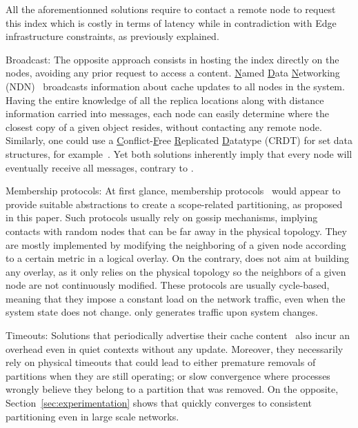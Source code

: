 \begin{asparadesc}
All the aforementionned solutions require to contact a remote node to request this index which is costly in terms of
latency while in contradiction with Edge infrastructure constraints, as previously explained.


\item [Broadcast:]
The opposite approach consists in hosting the index directly on the
nodes, avoiding any prior request to access a content.
\underline{N}amed \underline{D}ata \underline{N}etworking
(NDN)~\cite{nlsr} broadcasts information about cache updates to all nodes in the
system. Having the entire knowledge of all the
replica locations along with distance information carried into
messages, each node can easily determine where the closest copy of a
given object resides, without contacting any remote node.  Similarly,
one could use a
\underline{C}onflict-\underline{F}ree \underline{R}eplicated
\underline{D}atatype (CRDT) for set data structures, for
example~\cite{shapiro2011crdts}. Yet both solutions inherently imply
that every node will eventually receive all messages, contrary to \NAME.


\item [Membership protocols:]
At first glance, membership protocols~\cite{t-man}
would appear to provide suitable abstractions to create a
scope-related partitioning, as proposed in this paper. Such protocols
usually rely on gossip mechanisms, implying contacts with random nodes
that can be far away in the physical topology. 
They are mostly implemented by modifying the
neighboring of a given node according to a certain metric in a logical
overlay. On the contrary,  \NAME  does not aim at building any overlay, as
it only relies on the physical topology so the neighbors of a given node
are not continuously modified. These protocols are usually
cycle-based, meaning that they impose a constant load on the network
traffic, even when the system state does not change. \NAME only generates traffic upon system changes.

\item [Timeouts:]
Solutions that periodically advertise their
cache content~\cite{garcia-lopez, hemmati2015namebased} also
incur an overhead even in quiet contexts without any update.
Moreover, they necessarily rely on physical timeouts that
could lead to either premature removals of partitions when they are
still operating; or slow convergence where processes wrongly believe
they belong to a partition that was removed. On the opposite,
Section~\ref{sec:experimentation} shows that \NAME quickly converges
to consistent partitioning even in large scale networks.

\end{asparadesc}

